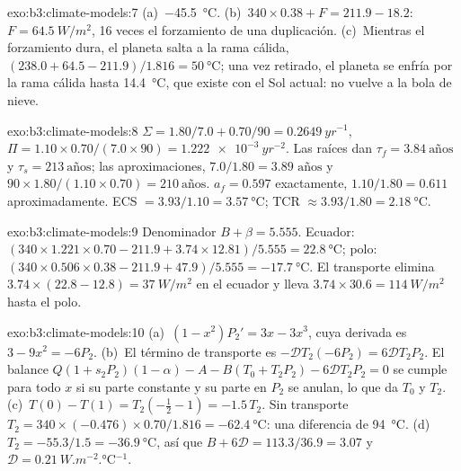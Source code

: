 \begin{solution}{exo:b3:climate-models:7}
(a)~\qty{-45.5}{\celsius}. (b)~$340\times0.38 + F = 211.9 - 18.2$: $F =
\qty{64.5}{W/m^2}$, 16 veces el forzamiento de una duplicación. (c)~Mientras el
forzamiento dura, el planeta salta a la rama cálida, $(238.0 + 64.5 -
211.9)/1.816 = \qty{50}{\celsius}$; una vez retirado, el planeta se enfría
por la rama cálida hasta \qty{14.4}{\celsius}, que existe con el Sol actual:
no vuelve a la bola de nieve.
\end{solution}

\begin{solution}{exo:b3:climate-models:8}
$\Sigma = 1.80/7.0 + 0.70/90 = \qty{0.2649}{yr^{-1}}$, $\Pi = 1.10\times0.70/
(7.0\times90) = \qty{1.222e-3}{yr^{-2}}$. Las raíces dan $\tau_f =
\num{3.84}~\text{años}$ y $\tau_s = \num{213}~\text{años}$; las aproximaciones,
$7.0/1.80 = \num{3.89}\text{ años}$ y $90\times1.80/(1.10\times0.70) =
\num{210}~\text{años}$. $a_f = 0.597$ exactamente, $1.10/1.80 = 0.611$
aproximadamente. ECS $= 3.93/1.10 = \qty{3.57}{\celsius}$; TCR $\approx
3.93/1.80 = \qty{2.18}{\celsius}$.
\end{solution}

\begin{solution}{exo:b3:climate-models:9}
Denominador $B + \beta = \num{5.555}$. Ecuador: $(340\times1.221\times0.70 -
211.9 + 3.74\times12.81)/5.555 = \qty{22.8}{\celsius}$; polo:
$(340\times0.506\times0.38 - 211.9 + 47.9)/5.555 = \qty{-17.7}{\celsius}$.
El transporte elimina $3.74\times(22.8 - 12.8) = \qty{37}{W/m^2}$ en el
ecuador y lleva $3.74\times30.6 = \qty{114}{W/m^2}$ hasta el polo.
\end{solution}

\begin{solution}{exo:b3:climate-models:10}
(a)~$(1 - x^2)P_2' = 3x - 3x^3$, cuya derivada es $3 - 9x^2 = -6P_2$.
(b)~El término de transporte es $-\mathcal D T_2(-6P_2) = 6\mathcal DT_2P_2$.
El balance $Q(1 + s_2P_2)(1 - \alpha) - A - B(T_0 + T_2P_2) - 6\mathcal
DT_2P_2 = 0$ se cumple para todo $x$ si su parte constante y su parte en $P_2$
se anulan, lo que da $T_0$ y $T_2$. (c)~$T(0) - T(1) = T_2(-\tfrac12 - 1)
= -1.5\,T_2$. Sin transporte $T_2 = 340\times(-0.476)\times0.70/1.816 =
\qty{-62.4}{\celsius}$: una diferencia de \qty{94}{\celsius}. (d)~$T_2 =
-55.3/1.5 = \qty{-36.9}{\celsius}$, así que $B + 6\mathcal D = 113.3/36.9 =
3.07$ y $\mathcal D = \qty{0.21}{W.m^{-2}.\celsius^{-1}}$.
\end{solution}

